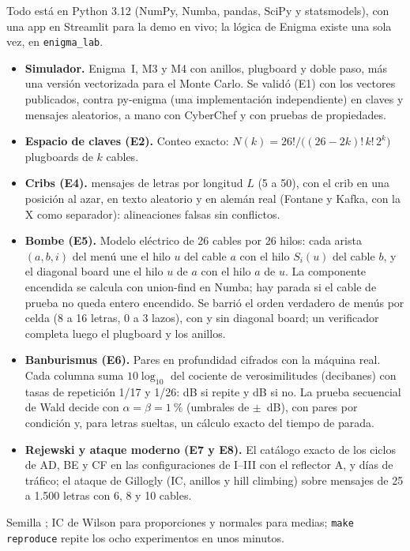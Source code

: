 \documentclass[11pt]{article}
\makeatletter
\renewcommand\section{\@startsection{section}{1}{\z@}{-1.6ex plus -0.5ex}{0.6ex}{\normalfont\large\bfseries}}
\makeatother
\begin{document}
\section{Método}

Todo está en Python 3.12 (NumPy, Numba, pandas, SciPy y statsmodels), con una app en Streamlit
para la demo en vivo; la lógica de Enigma existe una sola vez, en \texttt{enigma\_lab}.
\begin{itemize}
  \item \textbf{Simulador.} Enigma~I, M3 y M4 con anillos, plugboard y doble paso, más una
  versión vectorizada para el Monte Carlo. Se validó (E1) con los vectores publicados, contra
  py-enigma (una implementación independiente) en \ELpyenigmaCasos{} claves y mensajes
  aleatorios, a mano con CyberChef y con pruebas de propiedades.
  \item \textbf{Espacio de claves (E2).} Conteo exacto:
  $N(k)=26!/\bigl((26-2k)!\,k!\,2^k\bigr)$ plugboards de $k$ cables.
  \item \textbf{Cribs (E4).} \ELcribN{} mensajes de \ELcribLetras{} letras por longitud $L$
  (5 a 50), con el crib en una posición al azar, en texto aleatorio y en alemán real (Fontane y
  Kafka, con la X como separador): alineaciones falsas sin conflictos.
  \item \textbf{Bombe (E5).} Modelo eléctrico de 26 cables por 26 hilos: cada arista $(a,b,i)$
  del menú une el hilo $u$ del cable $a$ con el hilo $S_i(u)$ del cable $b$, y el diagonal board
  une el hilo $u$ de $a$ con el hilo $a$ de $u$. La componente encendida se calcula con
  union-find en Numba; hay parada si el cable de prueba no queda entero encendido. Se barrió el
  orden verdadero de \ELmenusPorCelda{} menús por celda (8 a 16 letras, 0 a 3 lazos), con y sin
  diagonal board; un verificador completa luego el plugboard y los anillos.
  \item \textbf{Banburismus (E6).} Pares en profundidad cifrados con la máquina real. Cada
  columna suma $10\log_{10}$ del cociente de verosimilitudes (decibanes) con tasas de repetición
  1/17 y 1/26: \ELdecibanRepeticion{} dB si repite y \ELdecibanNoRepeticion{} dB si no. La
  prueba secuencial de Wald decide con $\alpha=\beta=1~\%$ (umbrales de
  $\pm$\ELumbral{}~dB), con \ELparesBanbu{} pares por condición y, para letras sueltas, un
  cálculo exacto del tiempo de parada.
  \item \textbf{Rejewski y ataque moderno (E7 y E8).} El catálogo exacto de los ciclos de AD, BE y
  CF en las \ELrejConfiguraciones{} configuraciones de I--III con el reflector A, y \ELrejDias{}
  días de tráfico; el ataque de Gillogly (IC, anillos y hill climbing) sobre \ELataqueMensajes{} mensajes de 25 a 1.500 letras con 6, 8 y 10 cables.
\end{itemize}
Semilla \ELsemilla; IC de Wilson para proporciones y normales para medias; \texttt{make reproduce}
repite los ocho experimentos en unos \ELminutosExperimentos{} minutos.
\end{document}
